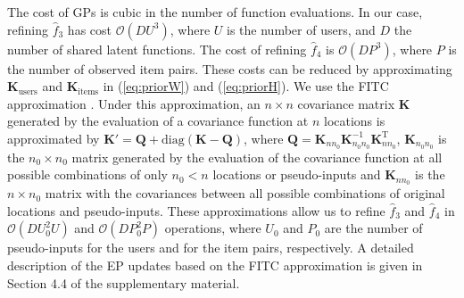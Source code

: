 The cost of GPs is cubic in the number of function evaluations. In our case, refining $\hat{f}_3$ has
cost $\mathcal{O}(DU^3)$, where $U$ is the number of users, and $D$ the number of shared latent functions.
The cost of refining $\hat{f}_4$ is $\mathcal{O}(DP^3)$,
where $P$ is the number of observed item pairs. These costs can be reduced by
approximating $\mathbf{K}_\text{users}$ and $\mathbf{K}_\text{items}$ in (\ref{eq:priorW}) and (\ref{eq:priorH}).
We use the FITC approximation \cite{Snelson2006}. Under this approximation, an $n \times n$ covariance
matrix $\mathbf{K}$ generated by the evaluation of a covariance function at $n$ locations
is approximated by $\mathbf{K}' =  \mathbf{Q} + \text{diag}(\mathbf{K} - \mathbf{Q})$, where
$\mathbf{Q} = \mathbf{K}_{nn_0} \mathbf{K}_{n_0n_0}^{-1} \mathbf{K}_{nn_0}^\text{T}$, $\mathbf{K}_{n_0n_0}$ is the
$n_0 \times n_0$ matrix generated by the evaluation of the covariance function at all possible combinations of
only $n_0 < n$ locations or pseudo-inputs and $\mathbf{K}_{nn_0}$ is the $n \times n_0$ matrix with the
covariances between all possible combinations of
original locations and pseudo-inputs. These approximations allow us to refine $\hat{f}_3$ and $\hat{f}_4$
in $\mathcal{O}(DU_0^2U)$ and $\mathcal{O}(DP_0^2P)$ operations, where $U_0$ and $P_0$ are the
number of pseudo-inputs for the users and for the item pairs, respectively.
A detailed description of the EP updates based on the FITC approximation is given in Section 4.4 of the supplementary material.
